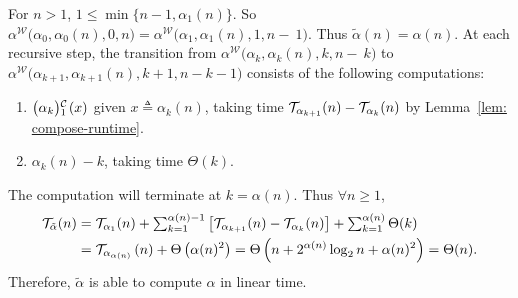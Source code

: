 For $n > 1$, $1\le \min\big\{n-1, \alpha_1(n)\big\}$. So
$\alpha^{\mathcal{W}}\big(\alpha_0, \alpha_0(n), 0, n\big) =
\alpha^{\mathcal{W}}\big(\alpha_1, \alpha_1(n), 1, n-~1\big)$.
Thus $\tilde{\alpha}(n) = \alpha(n)$. At each recursive step, the transition from $\alpha^{\mathcal{W}}\big(\alpha_k, \alpha_k(n), k, n-~k\big)$ to $\alpha^{\mathcal{W}}\big(\alpha_{k+1}, \alpha_{k+1}(n), k+1, n-k-1\big)$ consists of the following computations:
 \begin{enumerate}[label={(\arabic*)}]
	\item $\cdt{\big(\alpha_k\big)}{1}(x)$ given $x\triangleq \alpha_k(n)$, taking time $\mathcal{T}_{\alpha_{k+1}}(n) - \mathcal{T}_{\alpha_k}(n)$ by Lemma~\ref{lem: compose-runtime}.
	\item $\alpha_k(n) - k$, taking time $\Theta(k)$.
\end{enumerate}
The computation will terminate at $k = \alpha(n)$. Thus $\forall n\ge 1$,
\begin{equation} \label{eq: inv-ack-runtime-improved}
\begin{aligned}
\mathcal{T}_{\tilde{\alpha}}(n)
& = \textstyle \mathcal{T}_{\alpha_1}(n) + \sum_{k=1}^{\alpha(n) - 1}
\left[ \mathcal{T}_{\alpha_{k+1}}(n) - \mathcal{T}_{\alpha_k}(n)
\right] + \sum_{k=1}^{\alpha(n)}\Theta(k) \\
& = \mathcal{T}_{\alpha_{\alpha(n)}}\left(n\right) + \Theta\left(\alpha(n)^2\right)
= \Theta\left(n + 2^{\alpha(n)}\log_2n + \alpha(n)^2\right) = \Theta(n).
\end{aligned}
\end{equation}
Therefore, $\tilde{\alpha}$ is able to compute $\alpha$ in linear time.
